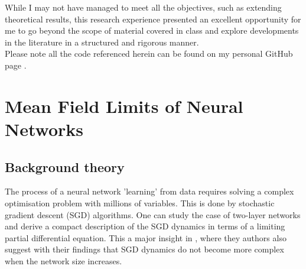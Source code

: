 \documentclass{article}
\begin{document}
While I may not have managed to meet all the objectives, such as extending theoretical results, this research experience presented an excellent opportunity for me to go beyond the scope of material covered in class and explore developments in the literature in a structured and rigorous manner. \\

Please note all the code referenced herein can be found on my personal GitHub page \cite{Tassopoulos_Imperial_Summer_Research_2023} . \\

\newpage
\section{Mean Field Limits of Neural Networks}

\subsection{Background theory}

The process of a neural network 'learning' from data requires solving a complex optimisation problem with millions of variables. This is done by stochastic gradient descent (SGD) algorithms. One can study the case of two-layer networks and derive a compact description of the SGD dynamics in terms of a limiting partial differential equation. This a major insight in \cite{Mei_2018}, where they authors also suggest with their findings that SGD dynamics do not become more complex when the network size increases.\\ 
\end{document}
